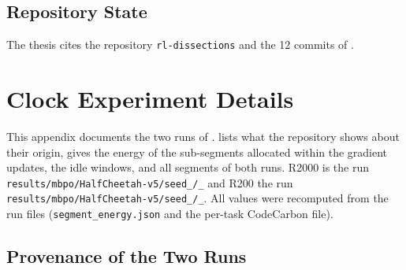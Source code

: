 \section{Repository State}\label{sec:app-repro-repo}

The thesis cites the repository \texttt{rl-dissections} and the \num{12} commits of .

\chapter{Clock Experiment Details}
\label{app:clock-details}

This appendix documents the two runs of .
 lists what the repository shows about their origin,  gives the energy of the sub-segments allocated within the gradient updates,  the idle windows, and  all segments of both runs.
R2000 is the run \texttt{results/\allowbreak mbpo/\allowbreak HalfCheetah-v5/\allowbreak seed\_/\_} and R200 the run \texttt{results/\allowbreak mbpo/\allowbreak HalfCheetah-v5/\allowbreak seed\_/\_}.
All values were recomputed from the run files (\texttt{segment\_\allowbreak energy.json} and the per-task CodeCarbon file).

\section{Provenance of the Two Runs}
\label{app:clock-provenance}

